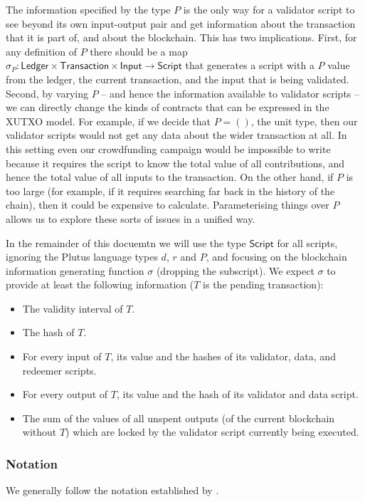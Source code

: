 \documentclass[a4paper]{article}
\theoremstyle{definition}  %
\begin{document}
The information specified by the type $P$ is the only way for a
validator script to see beyond its own input-output pair and get
information about the transaction that it is part of, and about the
blockchain. This has two implications. First, for any definition of
$P$ there should be a map $\sigma_P : \mathsf{Ledger} \times
\mathsf{Transaction} \times \mathsf{Input} \rightarrow
\mathsf{Script}$ that generates a script with a $P$ value from the
ledger, the current transaction, and the input that is being
validated. Second, by varying $P$ -- and hence the information
available to validator scripts -- we can directly change the kinds of
contracts that can be expressed in the XUTXO model. For example, if we
decide that $P = ()$, the unit type, then our validator scripts would
not get any data about the wider transaction at all. In this setting
even our crowdfunding campaign would be impossible to write because it
requires the script to know the total value of all contributions, and
hence the total value of all inputs to the transaction.  On the other
hand, if $P$ is too large (for example, if it requires searching far
back in the history of the chain), then it could be expensive to
calculate.  Parameterising things over $P$ allows us to explore these
sorts of issues in a unified way.

In the remainder of this docuemtn we will use the type
$\mathsf{Script}$ for all scripts, ignoring the Plutus language types
$d$, $r$ and $P$, and focusing on the blockchain information
generating function $\sigma$ (dropping the subscript).  We expect
$\sigma$ to provide at least the following information ($T$ is the
pending transaction):

\begin{itemize}
  
\item The validity interval of $T$.
\item The hash of $T$.
\item For every input of $T$, its value and the hashes of its
  validator, data, and redeemer scripts.
\item For every output of $T$, its value and the hash of its validator and
  data script.
\item The sum of the values of all unspent outputs (of the current
  blockchain without $T$) which are locked by the validator
  script currently being executed.
\end{itemize}

\subsubsection{Notation}
We generally follow the notation established by
\cite{Zahnentferner18-UTxO}.
\end{document}

